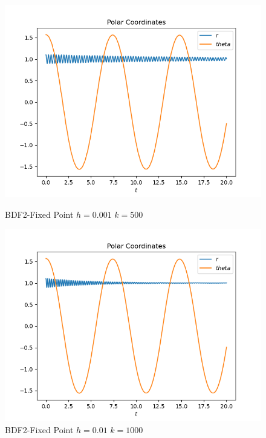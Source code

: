 \documentclass{scrartcl}
\begin{document}
\begin{figure}[h]
\centering
\begin{minipage}[b]{0.45\textwidth}
\centering
\includegraphics[width=\textwidth]{../Plots/BDF2/bdf2_h=0.01_k=500_c}
\caption{BDF2-Fixed Point $h=0.001$ $k=500$}
\label{exp_euler_k=50_h=0.001_c}
\end{minipage}
\hfill
\begin{minipage}[b]{0.45\textwidth}
\centering
\includegraphics[width=\textwidth]{../Plots/BDF2/bdf2_h=0.01_k=1000_c}
\caption{BDF2-Fixed Point $h=0.01$ $k=1000$}
\label{bdf2_h=00.1_k=1000_c}
\end{minipage}
\end{figure}
\end{document}
